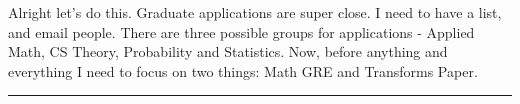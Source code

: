 \noindent {}

Alright let's do this. Graduate applications are super close. I need to have a list, and email people. There are three possible groups for applications - Applied Math, CS Theory, Probability and Statistics.  Now, before anything and everything I need to focus on two things: Math GRE and Transforms Paper.

\hrule
